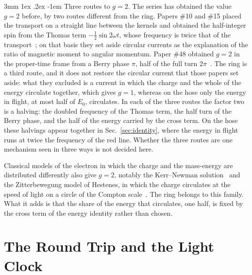 \documentclass[%
 reprint, amsmath,amssymb, aps, prb, ]{revtex4-2}
\makeatletter
\numberwithin{equation}{section}
\renewcommand\paragraph{%
  \@startsection{paragraph}{4}{\z@}%
    {3mm \@plus 1ex \@minus .2ex}%
    {-1em}%
    {\normalfont\normalsize\itshape}}
\makeatother
\begin{document}
\paragraph{Three routes to $g = 2$.} The series has obtained the value $g = 2$ before, by two routes different from the ring. Papers \#10 and \#15 placed the transport on a straight line between the kernels and obtained the half-integer spin from the Thomas term $-\tfrac12\sin2\omega t$, whose frequency is twice that of the transport~\cite{H10,H15}; on that basis they set aside circular currents as the explanation of the ratio of magnetic moment to angular momentum. Paper \#48 obtained $g = 2$ in the proper-time frame from a Berry phase $\pi$, half of the full turn $2\pi$~\cite{H48}. The ring is a third route, and it does not restore the circular current that those papers set aside: what they excluded is a current in which the charge and the whole of the energy circulate together, which gives $g = 1$, whereas on the hose only the energy in flight, at most half of $E_0$, circulates. In each of the three routes the factor two is a halving: the doubled frequency of the Thomas term, the half turn of the Berry phase, and the half of the energy carried by the cross term. On the hose these halvings appear together in Sec.~\ref{sec:identity}, where the energy in flight runs at twice the frequency of the red line. Whether the three routes are one mechanism seen in three ways is not decided here.

Classical models of the electron in which the charge and the mass-energy are distributed differently also give $g = 2$, notably the Kerr--Newman solution~\cite{Carter1968} and the Zitterbewegung model of Hestenes, in which the charge circulates at the speed of light on a circle of the Compton scale~\cite{Hestenes1990}. The ring belongs to this family. What it adds is that the share of the energy that circulates, one half, is fixed by the cross term of the energy identity rather than chosen.

\section{The Round Trip and the Light Clock}
\label{sec:clock}
\end{document}
